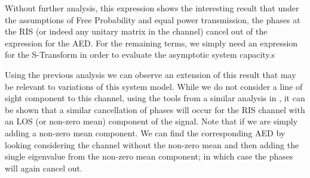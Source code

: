 \par
Without further analysis, this expression shows the interesting result that under the assumptions of Free Probability and equal power transmission, the phases at the RIS (or indeed any unitary matrix in the channel) cancel out of the expression for the AED. For the remaining terms, we simply need an expression for the S-Transform in order to evaluate the asymptotic system capacity.s
\par 
Using the previous analysis we can observe an extension of this result that may be relevant to variations of this system model. 
While we do not consider a line of sight component to this channel, using the tools from a similar analysis in \cite{muller2012channel}, it can be shown that 
a similar cancellation of phases will occur for the RIS channel with an LOS (or non-zero mean) component of the signal.
Note that if we are simply adding a non-zero mean component. We can find the corresponding AED by looking considering the channel without the non-zero mean and then adding the single eigenvalue from the non-zero mean component; in which case the phases will again cancel out. 



